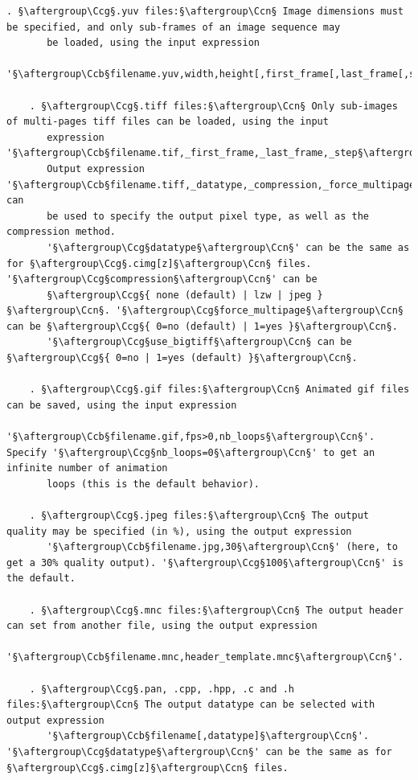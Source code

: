 \documentclass[a4paper,10.5pt,twoside]{book}
\def\Ccb{\color{cb}}
\def\Ccg{\color{cc}}
\def\Ccn{\color{black}}
\begin{document}
\begin{lstlisting}[escapechar=§]
    . §\aftergroup\Ccg§.yuv files:§\aftergroup\Ccn§ Image dimensions must be specified, and only sub-frames of an image sequence may 
       be loaded, using the input expression 
       '§\aftergroup\Ccb§filename.yuv,width,height[,first_frame[,last_frame[,step]]]§\aftergroup\Ccn§'. 
 
    . §\aftergroup\Ccg§.tiff files:§\aftergroup\Ccn§ Only sub-images of multi-pages tiff files can be loaded, using the input 
       expression '§\aftergroup\Ccb§filename.tif,_first_frame,_last_frame,_step§\aftergroup\Ccn§'. 
       Output expression '§\aftergroup\Ccb§filename.tiff,_datatype,_compression,_force_multipage,_use_bigtiff§\aftergroup\Ccn§' can 
       be used to specify the output pixel type, as well as the compression method. 
       '§\aftergroup\Ccg§datatype§\aftergroup\Ccn§' can be the same as for §\aftergroup\Ccg§.cimg[z]§\aftergroup\Ccn§ files. '§\aftergroup\Ccg§compression§\aftergroup\Ccn§' can be 
       §\aftergroup\Ccg§{ none (default) | lzw | jpeg }§\aftergroup\Ccn§. '§\aftergroup\Ccg§force_multipage§\aftergroup\Ccn§ can be §\aftergroup\Ccg§{ 0=no (default) | 1=yes }§\aftergroup\Ccn§. 
       '§\aftergroup\Ccg§use_bigtiff§\aftergroup\Ccn§ can be §\aftergroup\Ccg§{ 0=no | 1=yes (default) }§\aftergroup\Ccn§. 
 
    . §\aftergroup\Ccg§.gif files:§\aftergroup\Ccn§ Animated gif files can be saved, using the input expression 
       '§\aftergroup\Ccb§filename.gif,fps>0,nb_loops§\aftergroup\Ccn§'. Specify '§\aftergroup\Ccg§nb_loops=0§\aftergroup\Ccn§' to get an infinite number of animation 
       loops (this is the default behavior). 
 
    . §\aftergroup\Ccg§.jpeg files:§\aftergroup\Ccn§ The output quality may be specified (in %), using the output expression 
       '§\aftergroup\Ccb§filename.jpg,30§\aftergroup\Ccn§' (here, to get a 30% quality output). '§\aftergroup\Ccg§100§\aftergroup\Ccn§' is the default. 
 
    . §\aftergroup\Ccg§.mnc files:§\aftergroup\Ccn§ The output header can set from another file, using the output expression 
       '§\aftergroup\Ccb§filename.mnc,header_template.mnc§\aftergroup\Ccn§'. 
 
    . §\aftergroup\Ccg§.pan, .cpp, .hpp, .c and .h files:§\aftergroup\Ccn§ The output datatype can be selected with output expression 
       '§\aftergroup\Ccb§filename[,datatype]§\aftergroup\Ccn§'. '§\aftergroup\Ccg§datatype§\aftergroup\Ccn§' can be the same as for §\aftergroup\Ccg§.cimg[z]§\aftergroup\Ccn§ files. 
 

\end{lstlisting}
\end{document}
